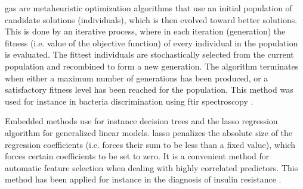 \gls{ga}s are metaheuristic optimization algorithms that use an initial population of candidate solutions (individuals), which is then evolved toward better solutions. This is done by an iterative process, where in each iteration (generation) the fitness (i.e. value of the objective function) of every individual in the population is evaluated. The fittest individuals are stochastically selected from the current population and recombined to form a new generation. The algorithm terminates when either a maximum number of generations has been produced, or a satisfactory fitness level has been reached for the population. This method was used for instance in bacteria discrimination using \gls{ftir} spectroscopy \citep{preisner2007fourier}.

Embedded methods use for instance decision trees and the \gls{lasso} regression algorithm for generalized linear models. \gls{lasso} penalizes the absolute size of the regression coefficients (i.e. forces their sum to be less than a fixed value), which forces certain coefficients to be set to zero. It is a convenient method for automatic feature selection when dealing with highly correlated predictors. This method has been applied for instance in the diagnosis of insulin resistance \citep{milburn2013application}.




